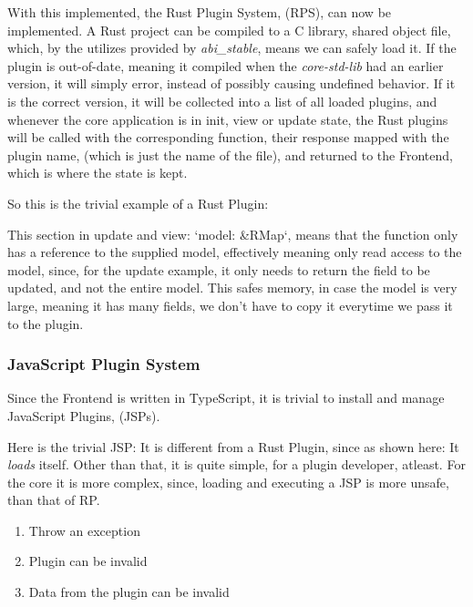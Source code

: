 \documentclass[runningheads]{llncs}
\begin{document}

With this implemented, the Rust Plugin System, (RPS), can now be implemented.
A Rust project can be compiled to a C library, shared object file, which, by the
utilizes provided by \textit{abi_stable}, means we can safely load it. If the
plugin is out-of-date, meaning it compiled when the \textit{core-std-lib} had an
earlier version, it will simply error, instead of possibly causing undefined
behavior. If it is the correct version, it will be collected into a list of all
loaded plugins, and whenever the core application is in init, view or update
state, the Rust plugins will be called with the corresponding function, their
response mapped with the plugin name, (which is just the name of the file), and
returned to the Frontend, which is where the state is kept.

So this is the trivial example of a Rust Plugin:

This section in update and view: `model: &RMap`, means that the function only
has a reference to the supplied model, effectively meaning only read access to
the model, since, for the update example, it only needs to return the field to
be updated, and not the entire model. This safes memory, in case the model is
very large, meaning it has many fields, we don't have to copy it everytime we
pass it to the plugin.

\subsubsection{JavaScript Plugin System}
Since the Frontend is written in TypeScript, it is trivial to install and manage
JavaScript Plugins, (JSPs).

Here is the trivial JSP:
It is different from a Rust Plugin, since as shown here:
It \textit{loads} itself. %
Other than that, it is quite simple, for a plugin developer, atleast. For the
core it is more complex, since, loading and executing a JSP is more unsafe, than
that of RP.

\begin{enumerate}
  \item Throw an exception
  \item Plugin can be invalid
  \item Data from the plugin can be invalid
\end{enumerate}
\end{document}
